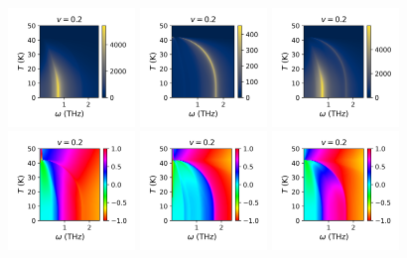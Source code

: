 \documentclass[a4paper]{article}
\begin{document}
\begin{figure}[H]
  \centering
  \includegraphics[width=0.3\textwidth]{v3-g1_abs.png}
  \includegraphics[width=0.3\textwidth]{v3-g2_abs.png}
  \includegraphics[width=0.3\textwidth]{v3-g3_abs.png}
  \includegraphics[width=0.3\textwidth]{v3-g1_phase.png}
  \includegraphics[width=0.3\textwidth]{v3-g2_phase.png}
  \includegraphics[width=0.3\textwidth]{v3-g3_phase.png}
\end{figure}
\end{document}
